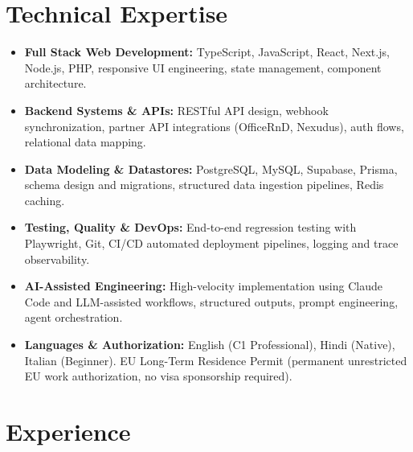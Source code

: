 \documentclass[10pt,a4paper]{article}
\begin{document}
\section{Technical Expertise}
\begin{itemize}
  \item \textbf{Full Stack Web Development:} TypeScript, JavaScript, React, Next.js, Node.js, PHP, responsive UI engineering, state management, component architecture.
  \item \textbf{Backend Systems \& APIs:} RESTful API design, webhook synchronization, partner API integrations (OfficeRnD, Nexudus), auth flows, relational data mapping.
  \item \textbf{Data Modeling \& Datastores:} PostgreSQL, MySQL, Supabase, Prisma, schema design and migrations, structured data ingestion pipelines, Redis caching.
  \item \textbf{Testing, Quality \& DevOps:} End-to-end regression testing with Playwright, Git, CI/CD automated deployment pipelines, logging and trace observability.
  \item \textbf{AI-Assisted Engineering:} High-velocity implementation using Claude Code and LLM-assisted workflows, structured outputs, prompt engineering, agent orchestration.
  \item \textbf{Languages \& Authorization:} English (C1 Professional), Hindi (Native), Italian (Beginner). EU Long-Term Residence Permit (permanent unrestricted EU work authorization, no visa sponsorship required).
\end{itemize}

\section{Experience}
\end{document}
